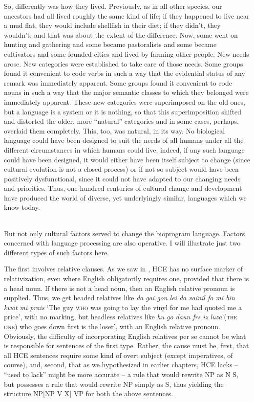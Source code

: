 So, differently was how they lived. Previously, as in all other species, our ancestors had all lived roughly the same kind of life; if they happened to live near a mud flat, they would include shellfish in their diet; if they didn't, they wouldn't; and that was about the extent of the difference. Now, some went on hunting and gathering and some became pastoralists and some became cultivators and some founded cities and lived by farming other people. New needs arose. New categories were established to take care of those needs. Some groups found it convenient to code verbs in such a way that the evidential status of any remark was immediately apparent. Some groups found it convenient to code nouns in such a way that the major semantic classes
to which they belonged were immediately apparent. These new categories were superimposed on the old ones, but a language is a system or it is nothing, so that this superimposition shifted and distorted the older, more ``natural'' categories and in some cases, perhaps, overlaid them completely. This, too, was natural, in its way. No biological language could have been designed to suit the needs of all humans under all the different circumstances in which humans could live; indeed, if any such language could have been designed, it would either have been itself subject to change (since cultural evolution is not a closed process) or if not so subject would have been positively dysfunctional, since it could not have adapted to our changing needs and priorities. Thus, one hundred centuries of cultural change and development have produced the world of diverse, yet underlyingly similar, languages which we know today.\\\\

But not only cultural factors served to change the bioprogram language. Factors concerned with language processing are also operative. I will illustrate just two different types of such factors here.

The first involves relative clauses. As we saw in , HCE has no surface marker of relativization, even where English obligatorily requires one, provided that there is a head noun. If there is not a head noun, then an English relative pronoun is supplied. Thus, we get headed relatives like \textit{da gai gon lei da vainil fo mi bin kwot mi prais} `The guy \textsc{who} was going to lay the vinyl for me had quoted me a price', with no marking, but headless relatives like \textit{hu go daun frs iz luza}'(\textsc{the one}) who goes down first is the loser', with an English relative pro\-noun. Obviously, the difficulty of incorporating English relatives per se cannot be what is responsible for sentences of the first type. Rather, the cause must be, first, that all HCE sentences require some kind of overt subject (except imperatives, of course), and, second, that as we hypothesized in earlier chapters, HCE lacks -- ``used to lack'' might be more accurate -- a rule that would rewrite NP as N S, but possesses a rule that would rewrite NP simply as S, thus yielding the structure NP[NP V X] VP for both the above sentences.


